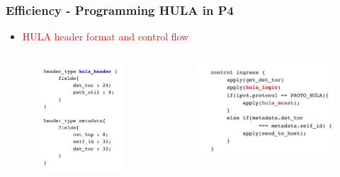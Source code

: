 \documentclass{beamer}
\begin{document}
\begin{frame}
	\frametitle{Efficiency - Programming HULA in P4}
		\begin{itemize}
			\item\textcolor{red}{HULA header format and control flow}\\
		\end{itemize}
		\begin{columns}[T] %
			\begin{column}[T]{6cm} 
	\begin{figure}
		\includegraphics[width=0.7\linewidth]{15}
	\end{figure}
\end{column}
\begin{column}[T]{6.5cm} 
		\begin{figure}
			\includegraphics[width=1\linewidth]{16}
		\end{figure}
	\end{column}
\end{columns}
\end{frame}
\end{document}
